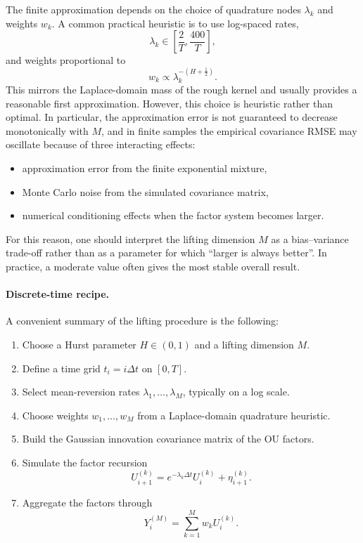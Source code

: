 The finite approximation depends on the choice of quadrature nodes \(\lambda_k\) and weights \(w_k\). A common practical heuristic is to use log-spaced rates,
\[
\lambda_k \in \left[\frac{2}{T},\frac{400}{T}\right],
\]
and weights proportional to
\[
w_k \propto \lambda_k^{-(H+\frac12)}.
\]
This mirrors the Laplace-domain mass of the rough kernel and usually provides a reasonable first approximation. However, this choice is heuristic rather than optimal. In particular, the approximation error is not guaranteed to decrease monotonically with \(M\), and in finite samples the empirical covariance RMSE may oscillate because of three interacting effects:
\begin{itemize}
    \item approximation error from the finite exponential mixture,
    \item Monte Carlo noise from the simulated covariance matrix,
    \item numerical conditioning effects when the factor system becomes larger.
\end{itemize}

For this reason, one should interpret the lifting dimension \(M\) as a bias--variance trade-off rather than as a parameter for which ``larger is always better''. In practice, a moderate value often gives the most stable overall result.

\paragraph{Discrete-time recipe.}

A convenient summary of the lifting procedure is the following:

\begin{enumerate}[label=\arabic*.]
    \item Choose a Hurst parameter \(H\in(0,1)\) and a lifting dimension \(M\).
    \item Define a time grid \(t_i=i\Delta t\) on \([0,T]\).
    \item Select mean-reversion rates \(\lambda_1,\dots,\lambda_M\), typically on a log scale.
    \item Choose weights \(w_1,\dots,w_M\) from a Laplace-domain quadrature heuristic.
    \item Build the Gaussian innovation covariance matrix of the OU factors.
    \item Simulate the factor recursion
    \[
    U_{i+1}^{(k)}=e^{-\lambda_k\Delta t}U_i^{(k)}+\eta_{i+1}^{(k)}.
    \]
    \item Aggregate the factors through
    \[
    Y_i^{(M)}=\sum_{k=1}^M w_k U_i^{(k)}.
    \]
\end{enumerate}

